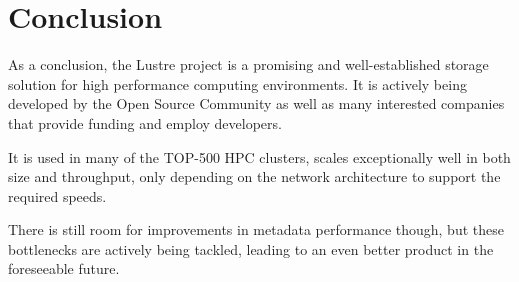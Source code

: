 \section{Conclusion}

As a conclusion, the Lustre project is a promising and well-established storage
solution for high performance computing environments. It is actively being
developed by the Open Source Community as well as many interested companies that
provide funding and employ developers.

It is used in many of the TOP-500 HPC clusters, scales exceptionally well in both
size and throughput, only depending on the network architecture to support the
required speeds.

There is still room for improvements in metadata performance though, but these
bottlenecks are actively being tackled, leading to an even better product in the
foreseeable future.
